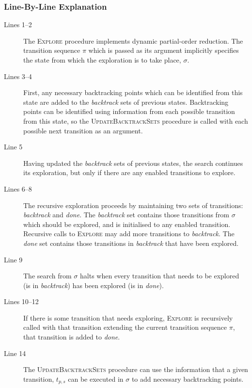\documentclass[12pt,a4paper,twoside,openright]{report}
\begin{document}
\subsubsection{Line-By-Line Explanation}
\label{sec:dpor-prep-walkthrough}
\begin{description}
	\item[Lines 1--2] The \textsc{Explore} procedure implements
	dynamic partial-order reduction. The transition sequence
	$\pi$ which is passed as its argument implicitly specifies the state
	from which the exploration is to take place, $\sigma$.

	\item[Lines 3--4] First, any necessary backtracking points
	which can be identified from this state are added to the
	\textit{backtrack} sets of previous states. Backtracking
	points can be identified using information from each possible
	transition from this state, so the \textsc{UpdateBacktrackSets}
	procedure is called with each possible next transition as an
	argument.

	\item[Line 5] Having updated the \textit{backtrack} sets
	of previous states, the search continues its exploration,
	but only if there are any enabled transitions to explore.

	\item[Lines 6--8] The recursive exploration proceeds by
	maintaining two sets of transitions: \textit{backtrack}
	and \textit{done}. The \textit{backtrack} set contains
	those transitions from $\sigma$ which should be explored,
	and is initialised to any enabled transition. Recursive calls to
	\textsc{Explore} may add more transitions to \textit{backtrack}.
	The \textit{done} set contains those transitions
	in \textit{backtrack} that have been explored.

	\item[Line 9] The search from $\sigma$ halts when every
	transition that needs to be explored (is in \textit{backtrack})
	has been explored (is in \textit{done}).

	\item[Lines 10--12] If there is some transition that needs
	exploring, \textsc{Explore} is recursively called with that
	transition extending the current transition sequence $\pi$,
	that transition is added to \textit{done}.

	\item[Line 14] The \textsc{UpdateBacktrackSets} procedure
	can use the information that a given transition, $t_{p,s}$ can be
	executed in $\sigma$ to add necessary backtracking points.


\end{description}
\end{document}
